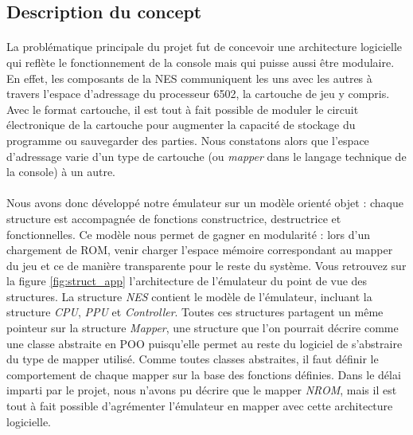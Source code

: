 \subsection{Description du concept}

\paragraph{}
La problématique principale du projet fut de concevoir une architecture logicielle qui reflète le fonctionnement de la console mais qui puisse aussi être modulaire. En effet, les composants de la NES communiquent les uns avec les autres à travers l'espace d'adressage du processeur 6502, la cartouche de jeu y compris. Avec le format cartouche, il est tout à fait possible de moduler le circuit électronique de la cartouche pour augmenter la capacité de stockage du programme ou sauvegarder des parties. Nous constatons alors que l'espace d'adressage varie d'un type de cartouche (ou \emph{mapper} dans le langage technique de la console) à un autre.

\paragraph{}
Nous avons donc développé notre émulateur sur un modèle orienté objet : chaque structure est accompagnée de fonctions constructrice, destructrice et fonctionnelles. Ce modèle nous permet de gagner en modularité : lors d'un chargement de ROM, venir charger l'espace mémoire correspondant au mapper du jeu et ce de manière transparente pour le reste du système. Vous retrouvez sur la figure \ref{fig:struct_app} l'architecture de l'émulateur du point de vue des structures. La structure \emph{NES} contient le modèle de l'émulateur, incluant la structure \emph{CPU}, \emph{PPU} et \emph{Controller}. Toutes ces structures partagent un même pointeur sur la structure \emph{Mapper}, une structure que l'on pourrait décrire comme une classe abstraite en POO puisqu'elle permet au reste du logiciel de s'abstraire du type de mapper utilisé. Comme toutes classes abstraites, il faut définir le comportement de chaque mapper sur la base des fonctions définies. Dans le délai imparti par le projet, nous n'avons pu décrire que le mapper \emph{NROM}, mais il est tout à fait possible d'agrémenter l'émulateur en mapper avec cette architecture logicielle.

